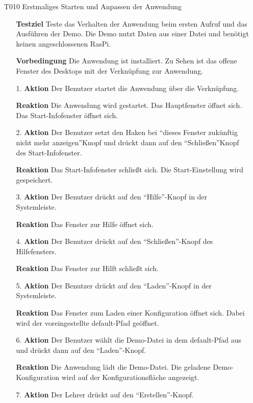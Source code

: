 \documentclass[parskip=full]{scrartcl}
\begin{document}
\begin{itemize} 

\item[T010] Erstmaliges Starten und Anpassen der Anwendung 
\begin{itemize}

\item []\textbf{Testziel} Teste das Verhalten der Anwendung beim ersten Aufruf und das Ausführen der Demo. Die Demo nutzt Daten aus einer Datei und benötigt keinen angeschlossenen \gls{RasPi}.

\item []\textbf{Vorbedingung} Die Anwendung ist installiert. Zu Sehen ist das offene Fenster des Desktops mit der Verknüpfung zur Anwendung.
\item [1.]\textbf{Aktion} Der Benutzer startet die Anwendung über die Verknüpfung.
\item []\textbf{Reaktion} Die Anwendung wird gestartet. Das Hauptfenster öffnet sich. Das Start-Infofenster öffnet sich.
\item [2.]\textbf{Aktion} Der Benutzer setzt den Haken bei "`dieses Fenster zukünftig nicht mehr anzeigen"'Knopf und drückt dann auf den "`Schließen"'Knopf des Start-Infofenster.
\item []\textbf{Reaktion} Das Start-Infofenster schließt sich. Die Start-Einstellung wird gespeichert. 
\item [3.]\textbf{Aktion} Der Benutzer drückt auf den "`Hilfe"'-Knopf in der Systemleiste.
\item []\textbf{Reaktion} Das Fenster zur Hilfe öffnet sich.
\item [4.]\textbf{Aktion} Der Benutzer drückt auf den "`Schließen"'-Knopf des Hilfefensters.
\item []\textbf{Reaktion} Das Fenster zur Hilft schließt sich.
\item [5.]\textbf{Aktion} Der Benutzer drückt auf den "`Laden"'-Knopf in der Systemleiste.
\item []\textbf{Reaktion} Das Fenster zum Laden einer Konfiguration öffnet sich. Dabei wird der voreingestellte default-Pfad geöffnet. 
\item [6.]\textbf{Aktion} Der Benutzer wählt die Demo-Datei in dem default-Pfad aus und drückt dann auf den "`Laden"'-Knopf. 
\item []\textbf{Reaktion} Die Anwendung lädt die Demo-Datei. Die geladene Demo-Konfiguration wird auf der Konfigurationsfläche angezeigt.
\item [7.]\textbf{Aktion} Der Lehrer drückt auf den "`Erstellen"'-Knopf.

\end{itemize}
\end{itemize}
\end{document}
